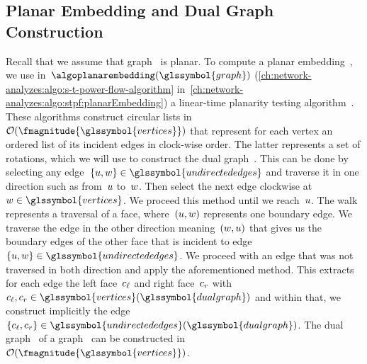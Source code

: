 \subsection{Planar Embedding and Dual Graph Construction}
\label{ch:network-analyzes:sec:planar-embedding-dual-graph-construction}
%
Recall that we assume that graph~ is planar. To compute a
planar embedding~, we use
in~$\algoplanarembedding(\glssymbol{graph})$
(\cref{ch:network-analyzes:algo:s-t-power-flow-algorithm}
in~\cref{ch:network-analyzes:algo:stpf:planarEmbedding}) a linear-time planarity
testing algorithm~\parencite{Hop74}\parencite[p.345]{Ros86}. These algorithms
construct circular lists in~$\bigO(\fmagnitude{\glssymbol{vertices}})$ that
represent for each vertex an ordered list of its incident edges in clock-wise
order. The latter represents a set of rotations, which we will use to construct
the dual graph~. This can be done by selecting any edge~$
\{\vertexa,\vertexc\}\in\glssymbol{undirectededges}$ and traverse it in one
direction such as from~$u$ to~$w$. Then select the next edge
clockwise at~$\vertexc\in\glssymbol{vertices}$. We proceed this method until we
reach~$u$. The walk represents a traversal of a face, where~$
(u,w)$ represents one boundary edge. We traverse the edge in the
other direction meaning~$(w,u)$ that gives us the boundary edges
of the other face that is incident to
edge~$\{\vertexa,\vertexc\}\in\glssymbol{undirectededges}$. We proceed with an
edge that was not traversed in both direction and apply the aforementioned
method. This extracts for each edge the left face~$c_{\ell}$ and right
face~$c_{r}$ with~$
    \cycle_{\leftish},
    \cycle_{\rightish}
    \in
    \glssymbol{vertices}(\glssymbol{dualgraph})
$ and within that, we construct implicitly the edge~$
    \{
    \cycle_{\leftish}, 
    \cycle_{\rightish}
    \}
    \in
    \glssymbol{undirectededges}(\glssymbol{dualgraph})
$. The dual graph~ of a graph~ can be
constructed in~$\bigO(\fmagnitude{\glssymbol{vertices}})$.

